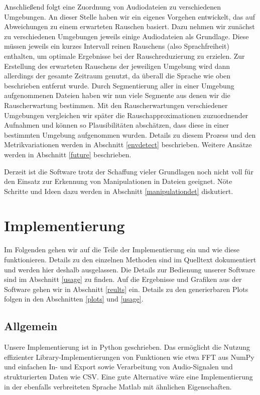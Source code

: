 \documentclass[
	fontsize=10.5pt,
	marginpar=false,
	ngerman,
	accentcolor=3d
	]{tudapub}
\begin{document}
Anschließend folgt eine Zuordnung von Audiodateien zu verschiedenen Umgebungen. An dieser Stelle haben wir ein eigenes Vorgehen entwickelt, das auf Abweichungen zu einem erwarteten Rauschen basiert. Dazu nehmen wir zunächst zu verschiedenen Umgebungen jeweils einige Audiodateien als Grundlage. Diese müssen jeweils ein kurzes Intervall reinen Rauschens (also Sprachfreiheit) enthalten, um optimale Ergebnisse bei der Rauschreduzierung zu erzielen. Zur Erstellung des erwarteten Rauschens der jeweiligen Umgebung wird dann allerdings der gesamte Zeitraum genutzt, da überall die Sprache wie oben beschrieben entfernt wurde. Durch Segmentierung aller in einer Umgebung aufgenommenen Dateien haben wir nun viele Segmente aus denen wir die Rauscherwartung bestimmen. Mit den Rauscherwartungen verschiedener Umgebungen vergleichen wir später die Rauschapproximationen zuzuordnender Aufnahmen und können so Plausibilitäten abschätzen, dass diese in einer bestimmten Umgebung aufgenommen wurden. Details zu diesem Prozess und den Metrikvariationen werden in Abschnitt \ref{envdetect} beschrieben. Weitere Ansätze werden in Abschnitt \ref{future} beschrieben.

Derzeit ist die Software trotz der Schaffung vieler Grundlagen noch nicht voll für den Einsatz zur Erkennung von Manipulationen in Dateien geeignet. Nöte Schritte und Ideen dazu werden in Abschnitt \ref{manipulationdet} diskutiert.

\pagebreak
\section{Implementierung}
Im Folgenden gehen wir auf die Teile der Implementierung ein und wie diese funktionieren. Details zu den einzelnen Methoden sind im Quelltext dokumentiert und werden hier deshalb ausgelassen. Die Details zur Bedienung unserer Software sind im Abschnitt \ref{usage} zu finden. Auf die Ergebnisse und Grafiken aus der Software gehen wir in Abschnitt \ref{reults} ein. Details zu den generierbaren Plots folgen in den Abschnitten \ref{plots} und \ref{usage}.

\subsection{Allgemein}

Unsere Implementierung ist in Python geschrieben. Das ermöglicht die Nutzung effizienter Library-\linebreak Implementierungen von Funktionen wie etwa FFT aus NumPy und einfachen In- und Export sowie Verarbeitung von Audio-Signalen und strukturierten Daten wie CSV. Eine gute Alternative wäre eine Implementierung in der ebenfalls verbreiteten Sprache Matlab mit ähnlichen Eigenschaften.
\end{document}
